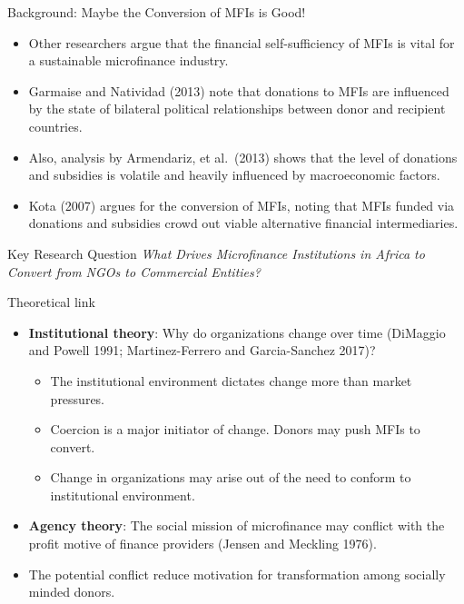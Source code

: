 \documentclass[
  ignorenonframetext,
]{beamer}
\providecommand{\tightlist}{%
  \setlength{\itemsep}{0pt}\setlength{\parskip}{0pt}}
\begin{document}
\begin{frame}{Background: Maybe the Conversion of MFIs is Good!}
\protect\hypertarget{background-maybe-the-conversion-of-mfis-is-good}{}
\begin{itemize}
\item
  Other researchers argue that the financial self-sufficiency of MFIs is
  vital for a sustainable microfinance industry.
\item
  Garmaise and Natividad (2013) note that donations to MFIs are
  influenced by the state of bilateral political relationships between
  donor and recipient countries.
\item
  Also, analysis by Armendariz, et al.~(2013) shows that the level of
  donations and subsidies is volatile and heavily influenced by
  macroeconomic factors.
\item
  Kota (2007) argues for the conversion of MFIs, noting that MFIs funded
  via donations and subsidies crowd out viable alternative financial
  intermediaries.
\end{itemize}
\end{frame}

\begin{frame}{Key Research Question}
\protect\hypertarget{key-research-question}{}
\emph{What Drives Microfinance Institutions in Africa to Convert from
NGOs to Commercial Entities?}
\end{frame}

\begin{frame}{Theoretical link}
\protect\hypertarget{theoretical-link}{}
\begin{itemize}
\item
  \textbf{Institutional theory}: Why do organizations change over time
  (DiMaggio and Powell 1991; Martinez-Ferrero and Garcia-Sanchez 2017)?

  \begin{itemize}
  \tightlist
  \item
    The institutional environment dictates change more than market
    pressures.
  \item
    Coercion is a major initiator of change. Donors may push MFIs to
    convert.
  \item
    Change in organizations may arise out of the need to conform to
    institutional environment.
  \end{itemize}
\item
  \textbf{Agency theory}: The social mission of microfinance may
  conflict with the profit motive of finance providers (Jensen and
  Meckling 1976).
\item
  The potential conflict reduce motivation for transformation among
  socially minded donors.
\end{itemize}
\end{frame}
\end{document}
